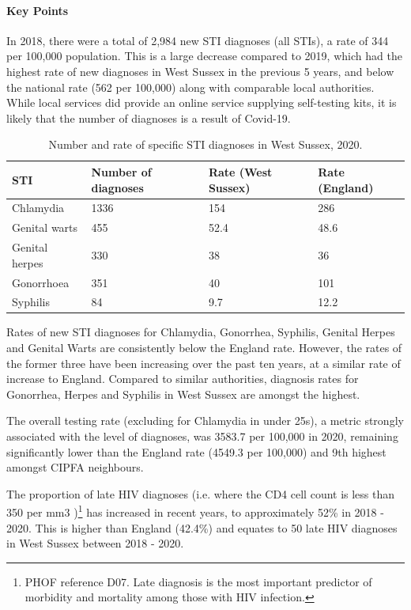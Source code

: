 
\paragraph{Key Points} In 2018, there were a total of 2,984 new STI diagnoses (all STIs), a rate of 344 per 100,000 population. This is a large decrease compared to 2019, which had the highest rate of new diagnoses in West Sussex in the previous 5 years, and below the national rate (562 per 100,000) along with comparable local authorities. While local services did provide an online service supplying self-testing kits, it is likely that the number of diagnoses is a result of Covid-19. 

\begin{table}
    \caption{Number and rate of specific STI diagnoses in West Sussex, 2020.}
    \centering
    \begin{tabular}{llll}
    \toprule
    STI & Number of diagnoses & Rate (West Sussex) & Rate (England) \\
    \midrule
    Chlamydia & 1336 & 154 & 286 \\
    Genital warts & 455 & 52.4 & 48.6 \\
    Genital herpes & 330 & 38 & 36 \\
    Gonorrhoea & 351 & 40 & 101 \\
    Syphilis & 84 & 9.7 & 12.2 \\
    \bottomrule
    \end{tabular}
    \label{tab:wa:stis}
\end{table}

Rates of new STI diagnoses for Chlamydia, Gonorrhea, Syphilis, Genital Herpes and Genital Warts are consistently below the England rate. However, the rates of the former three have been increasing over the past ten years, at a similar rate of increase to England. Compared to similar authorities, diagnosis rates for Gonorrhea, Herpes and Syphilis in West Sussex are amongst the highest.

The overall testing rate (excluding for Chlamydia in under 25s), a metric strongly associated with the level of diagnoses, was 3583.7 per 100,000 in 2020, remaining significantly lower than the England rate (4549.3 per 100,000) and 9th highest amongst CIPFA neighbours.

The proportion of late HIV diagnoses (i.e. where the CD4 cell count is less than 350 per mm3 )\footnote{PHOF reference D07. Late diagnosis is the most important predictor of morbidity and mortality among those with HIV infection.} has increased in recent years, to approximately 52\% in 2018 - 2020. This is higher than England (42.4\%) and equates to 50 late HIV diagnoses in West Sussex between 2018 - 2020.

